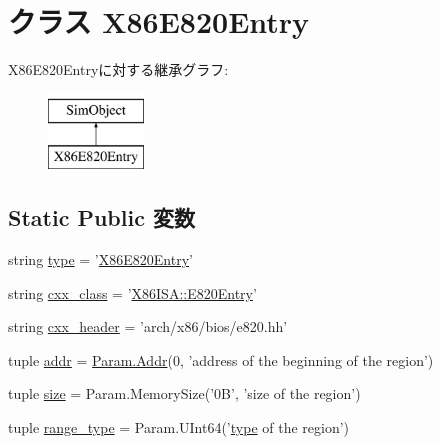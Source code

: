 \hypertarget{classE820_1_1X86E820Entry}{
\section{クラス X86E820Entry}
\label{classE820_1_1X86E820Entry}
}
X86E820Entryに対する継承グラフ:\begin{figure}[H]
\begin{center}
\leavevmode
\includegraphics[height=2cm]{classE820_1_1X86E820Entry}
\end{center}
\end{figure}
\subsection*{Static Public 変数}
\begin{DoxyCompactItemize}
\item 
string \hyperlink{classE820_1_1X86E820Entry_acce15679d830831b0bbe8ebc2a60b2ca}{type} = '\hyperlink{classE820_1_1X86E820Entry}{X86E820Entry}'
\item 
string \hyperlink{classE820_1_1X86E820Entry_a58cd55cd4023648e138237cfc0822ae3}{cxx\_\-class} = '\hyperlink{classX86ISA_1_1E820Entry}{X86ISA::E820Entry}'
\item 
string \hyperlink{classE820_1_1X86E820Entry_a17da7064bc5c518791f0c891eff05fda}{cxx\_\-header} = 'arch/x86/bios/e820.hh'
\item 
tuple \hyperlink{classE820_1_1X86E820Entry_a2173c231c978de69ce30d0430739f1a1}{addr} = \hyperlink{base_2types_8hh_af1bb03d6a4ee096394a6749f0a169232}{Param.Addr}(0, 'address of the beginning of the region')
\item 
tuple \hyperlink{classE820_1_1X86E820Entry_a377e5da8df1f89c5468c8b8cd07eac89}{size} = Param.MemorySize('0B', 'size of the region')
\item 
tuple \hyperlink{classE820_1_1X86E820Entry_aac9d74b64a0733a055c83ee5ad93d13f}{range\_\-type} = Param.UInt64('\hyperlink{classE820_1_1X86E820Entry_acce15679d830831b0bbe8ebc2a60b2ca}{type} of the region')
\end{DoxyCompactItemize}


